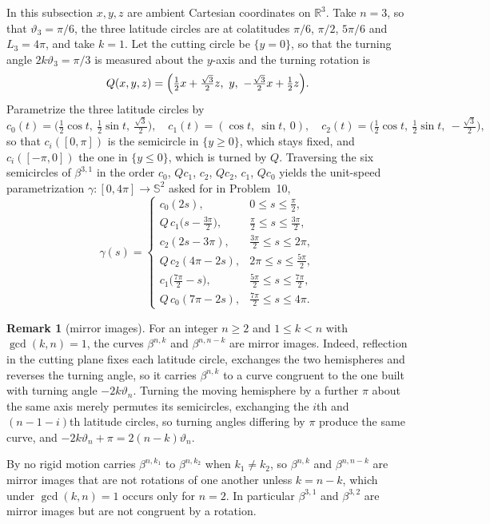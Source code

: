 \documentclass[11pt,oneside,reqno]{amsart}
\theoremstyle{plain}
\theoremstyle{definition}
\newtheorem{remark}[theorem]{Remark}
\newcommand{\Sph}{\mathbb{S}^{2}}
\newcommand{\R}{\mathbb{R}}
\newcommand{\bta}[2]{\beta^{#1,#2}}
\begin{document}
In this subsection $x,y,z$ are ambient Cartesian coordinates on $\R^{3}$.
Take $n=3$, so that $\vartheta_{3}=\pi/6$, the three
latitude circles are at colatitudes $\pi/6$, $\pi/2$, $5\pi/6$ and $L_{3}=4\pi$,
and take $k=1$. Let the cutting circle be $\{y=0\}$, so that the turning angle
$2k\vartheta_{3}=\pi/3$ is measured about the $y$-axis and the turning rotation is
\begin{equation}
  Q(x,y,z)=\Bigl(\tfrac{1}{2}x+\tfrac{\sqrt3}{2}z,\ y,\
  -\tfrac{\sqrt3}{2}x+\tfrac{1}{2}z\Bigr).
\end{equation}
Parametrize the three latitude circles by
\begin{equation}
  c_{0}(t)=\bigl(\tfrac12\cos t,\ \tfrac12\sin t,\ \tfrac{\sqrt3}{2}\bigr),
  \quad
  c_{1}(t)=(\cos t,\ \sin t,\ 0),
  \quad
  c_{2}(t)=\bigl(\tfrac12\cos t,\ \tfrac12\sin t,\ -\tfrac{\sqrt3}{2}\bigr),
\end{equation}
so that $c_{i}([0,\pi])$ is the semicircle in $\{y\ge0\}$, which stays fixed,
and $c_{i}([-\pi,0])$ the one in $\{y\le0\}$, which is turned by $Q$.
Traversing the six semicircles of $\bta{3}{1}$ in the order
$c_{0}$, $Qc_{1}$, $c_{2}$, $Qc_{2}$, $c_{1}$, $Qc_{0}$ yields the unit-speed
parametrization $\gamma\colon[0,4\pi]\to\Sph$ asked for in Problem~10,
{\tiny
\begin{equation}\label{eq:six-arc}
  \gamma(s)=
  \begin{cases}
    c_{0}(2s), & 0\le s\le\tfrac{\pi}{2},\\[2pt]
    Q\,c_{1}\bigl(s-\tfrac{3\pi}{2}\bigr), & \tfrac{\pi}{2}\le s\le\tfrac{3\pi}{2},\\[2pt]
    c_{2}(2s-3\pi), & \tfrac{3\pi}{2}\le s\le2\pi,\\[2pt]
    Q\,c_{2}(4\pi-2s), & 2\pi\le s\le\tfrac{5\pi}{2},\\[2pt]
    c_{1}\bigl(\tfrac{7\pi}{2}-s\bigr), & \tfrac{5\pi}{2}\le s\le\tfrac{7\pi}{2},\\[2pt]
    Q\,c_{0}(7\pi-2s), & \tfrac{7\pi}{2}\le s\le4\pi .
  \end{cases}
\end{equation}
}
\begin{remark}[mirror images]\label{rem:mirror}
For an integer $n\ge2$ and $1\le k<n$ with $\gcd(k,n)=1$, the curves $\bta{n}{k}$
and $\bta{n}{n-k}$ are mirror images. Indeed, reflection in the cutting plane
fixes each latitude circle, exchanges the two hemispheres and reverses the
turning angle, so it carries $\bta{n}{k}$ to a curve congruent to the one built
with turning angle $-2k\vartheta_{n}$. Turning the moving hemisphere by a
further $\pi$ about the same axis merely permutes its semicircles, exchanging
the $i$th and $(n-1-i)$th latitude circles, so turning angles differing by
$\pi$ produce the same curve, and $-2k\vartheta_{n}+\pi=2(n-k)\vartheta_{n}$.

By \cite[Lemma~1]{GvdM2011b} no rigid motion carries $\bta{n}{k_{1}}$ to
$\bta{n}{k_{2}}$ when $k_{1}\ne k_{2}$, so $\bta{n}{k}$ and $\bta{n}{n-k}$ are
mirror images that are not rotations of one another unless $k=n-k$, which under
$\gcd(k,n)=1$ occurs only for $n=2$. In particular $\bta{3}{1}$ and
$\bta{3}{2}$ are mirror images but are not congruent by a rotation.
\end{remark}
\end{document}
